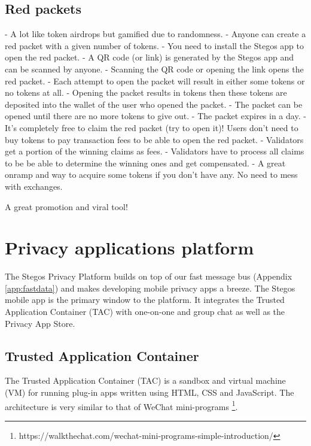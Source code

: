 \documentclass[8pt,fleqn,openany]{book}
\begin{document}
\subsection{Red packets}

- A lot like token airdrops but gamified due to randomness.
- Anyone can create a red packet with a given number of tokens.
- You need to install the Stegos app to open the red packet.
- A QR code (or link) is generated by the Stegos app and can be scanned by anyone. 
- Scanning the QR code or opening the link opens the red packet.
- Each attempt to open the packet will result in either some tokens or no tokens at all.
- Opening the packet results in tokens then these tokens are deposited into the wallet of the user who opened the packet.
- The packet can be opened until there are no more tokens to give out.
- The packet expires in a day.
- It's completely free to claim the red packet (try to open it)! Users don't need to buy tokens to pay transaction fees to be able to open the red packet.
- Validators get a portion of the winning claims as fees. 
- Validators have to process all claims to be be able to determine the winning ones and get compensated. 
- A great onramp and way to acquire some tokens if you don't have any. No need to mess with exchanges.

A great promotion and viral tool!

\section{Privacy applications platform}

The Stegos Privacy Platform builds on top of our fast message bus (Appendix \ref{app:fastdata}) and makes developing mobile privacy apps a breeze. The Stegos mobile app is the primary window to the platform. It integrates the Trusted Application Container (TAC) with one-on-one and group chat as well as the  Privacy App Store. 

\subsection{Trusted Application Container}\label{TAC}
The Trusted Application Container (TAC) is a sandbox and virtual machine (VM) for running plug-in apps written using HTML, CSS and JavaScript. The architecture is very similar to that of WeChat mini-programs \footnote{https://walkthechat.com/wechat-mini-programs-simple-introduction/}.
\end{document}
